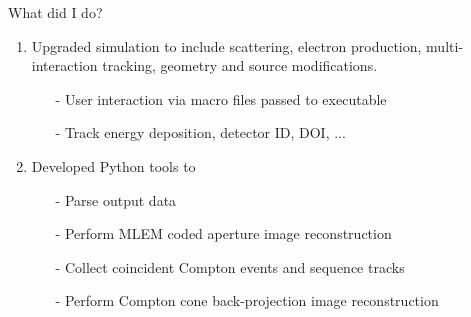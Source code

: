 \documentclass[xcolor=x11names,compress]{beamer}
\renewcommand{\(}{\begin{columns}}
\renewcommand{\)}{\end{columns}}
\newcommand{\<}[1]{\begin{column}{#1}}
\renewcommand{\>}{\end{column}}
\begin{document}
\begin{frame}{What did I do?}


\begin{enumerate}\setlength\itemsep{1.3em}
\item Upgraded simulation to include scattering, electron production, multi-interaction tracking, geometry and source modifications. 
\begin{itemize}
\small
\item[-] User interaction via macro files passed to executable
\item[-] Track energy deposition, detector ID, DOI, ...
\end{itemize}
\item Developed Python tools to 
\begin{itemize}
\small
\item[-] Parse output data
\item[-] Perform MLEM coded aperture image reconstruction
\item[-] Collect coincident Compton events and sequence tracks
\item[-] Perform Compton cone back-projection image reconstruction
\end{itemize}
\end{enumerate}



\end{frame}
\end{document}
